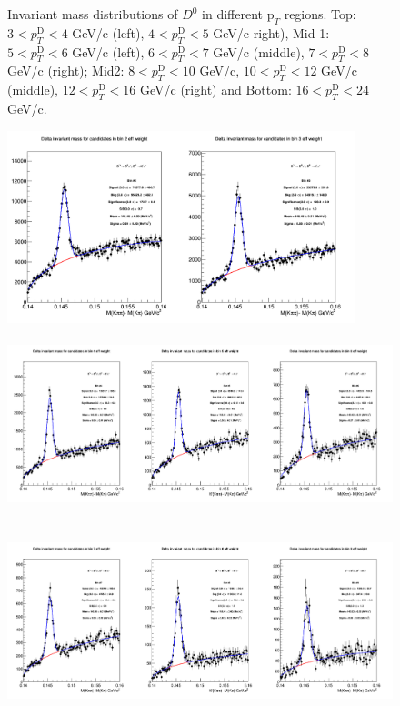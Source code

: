 \begin{figure}[!htp]
\caption{Invariant mass distributions of $D^0$ in different $\text{p}_T$ regions. Top: $3< p_{T}^{\text{D}}< 4$ GeV/c (left), $4< p_{T}^{\text{D}}< 5$ GeV/c right), Mid 1: $5< p_{T}^{\text{D}}< 6$ GeV/c (left), $6 < p_{T}^{\text{D}} < 7$ GeV/c (middle), $7< p_{T}^{\text{D}}< 8$ GeV/c (right); Mid2: $8< p_{T}^{\text{D}}< 10$ GeV/c, $10< p_{T}^{\text{D}}< 12$ GeV/c  (middle), $12 < p_{T}^{\text{D}}< 16$ GeV/c  (right) and Bottom: $16<p_{T}^{\text{D}}< 24$ GeV/c.}
\label{fig:InvMassD0}
\end{figure}

\begin{figure}[!htp]
\centering
{\includegraphics[width=1\linewidth, height=5.6cm]{figures/Dstar_wEFF/InvMassDistributions_Dstar_Bins2to3.png}}
{\includegraphics[width=1\linewidth, height=5.6cm]{figures/Dstar_wEFF/InvMassDistributions_Dstar_Bins4to6.png}}
{\includegraphics[width=1\linewidth, height=5.6cm]{figures/Dstar_wEFF/InvMassDistributions_Dstar_Bins7to9.png}}

\end{figure}
